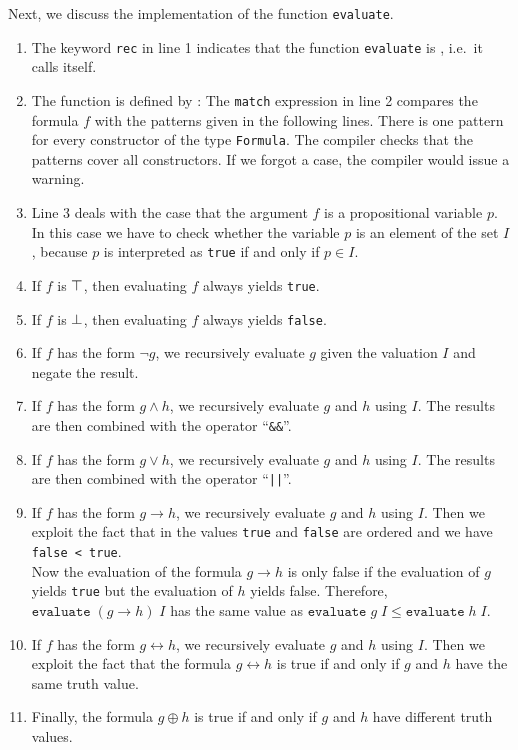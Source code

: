\noindent
Next, we discuss the implementation of the function \texttt{evaluate}.
\begin{enumerate}
\item The keyword \texttt{rec} in line 1 indicates that the function \texttt{evaluate} is ,
      i.e.~it calls itself.
\item The function is defined by : The \texttt{match} expression in line 2 compares
      the formula $f$ with the patterns given in the following lines.  There is one pattern for every
      constructor of the type \texttt{Formula}.  The \Fsharp{} compiler checks that the patterns cover all
      constructors.  If we forgot a case, the compiler would issue a warning.
\item Line 3 deals with the case that the argument $f$ is a propositional variable $p$.
      In this case we have to check whether the variable $p$ is an element of the set $I$, because $p$ is
      interpreted as \texttt{true} if and only if $p \in I$.
\item If $f$ is $\top$, then evaluating $f$ always yields \texttt{true}.
\item If $f$ is $\bot$, then evaluating $f$ always yields \texttt{false}. 
\item If $f$ has the form $\neg g$, we recursively evaluate $g$ given the valuation $I$ and negate the result.
\item If $f$ has the form $g \wedge h$, we recursively evaluate
      $g$ and $h$ using $I$.  The results are then combined with the \Fsharp{} operator
      ``\texttt{\&\&}''.
\item If $f$ has the form $g \vee h$, we recursively evaluate
      $g$ and $h$ using $I$.  The results are then combined with the \Fsharp{} operator
      ``\texttt{||}''.
\item If $f$ has the form $g \rightarrow h$, we recursively evaluate
      $g$ and $h$ using $I$.  Then we exploit the fact that in \Fsharp{} the values \texttt{true} and
      \texttt{false} are ordered and we have
      \\[0.2cm]
      \hspace*{1.3cm}
      \texttt{false < true}.
      \\[0.2cm]
      Now the evaluation of the formula $g \rightarrow h$ is only false if the evaluation of $g$ yields \texttt{true} but the
      evaluation of $h$ yields false.  Therefore, 
      \\[0.2cm]
      \hspace*{1.3cm}
      $\texttt{evaluate}\;(g \rightarrow h)\;I$ \quad has the same value as \quad
      $\texttt{evaluate}\;g\;I \leq \texttt{evaluate}\;h\;I$.
\item If $f$ has the form $g \leftrightarrow h$, we recursively evaluate
      $g$ and $h$ using $I$.  Then we exploit the fact that the formula $g \leftrightarrow h$ is true if and
      only if $g$ and $h$ have the same truth value.
\item Finally, the formula $g \oplus h$ is true if and only if $g$ and $h$ have different truth values.
\end{enumerate}

